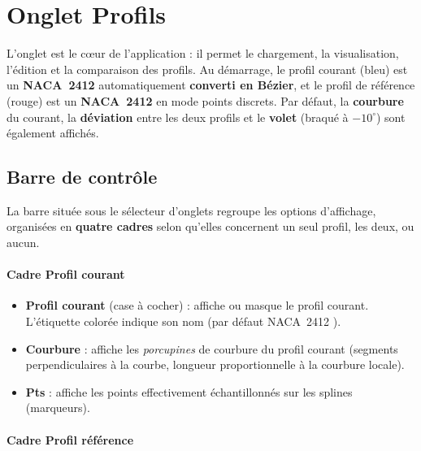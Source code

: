 \chapter{Onglet Profils}
\label{chap:profils}

L'onglet  est le cœur de l'application : il permet
le chargement, la visualisation, l'édition et la comparaison des
profils. Au démarrage, le profil courant (bleu) est un
\textbf{NACA~2412} automatiquement \textbf{converti en Bézier}, et
le profil de référence (rouge) est un \textbf{NACA~2412} en mode
points discrets. Par défaut, la \textbf{courbure} du courant, la
\textbf{déviation} entre les deux profils et le \textbf{volet}
(braqué à $-10^\circ$) sont également affichés.


\section{Barre de contrôle}

La barre située sous le sélecteur d'onglets regroupe les options
d'affichage, organisées en \textbf{quatre cadres} selon qu'elles
concernent un seul profil, les deux, ou aucun.

\subsubsection*{Cadre \og Profil courant \fg{}}

\begin{itemize}
    \item \textbf{Profil courant} (case à cocher) : affiche ou
        masque le profil courant. L'étiquette colorée indique
        son nom (par défaut \og NACA~2412 \fg{}).
    \item \textbf{Courbure} : affiche les \emph{porcupines} de
        courbure du profil courant (segments perpendiculaires à la
        courbe, longueur proportionnelle à la courbure locale).
    \item \textbf{Pts} : affiche les points effectivement
        échantillonnés sur les splines (marqueurs).
\end{itemize}

\subsubsection*{Cadre \og Profil référence \fg{}}

